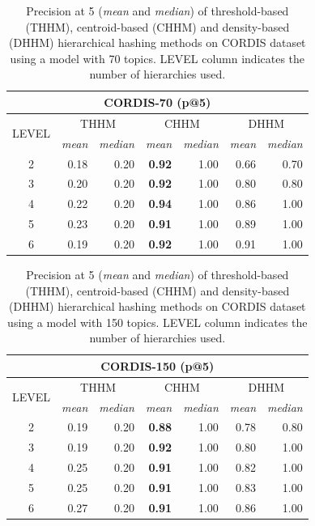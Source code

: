 \begin{table}\centering
  \scriptsize
  \begin{tabular}{c|rr||rr||rr}
    \multicolumn{7}{c}{CORDIS-70 (p@5)} \\
    \toprule
    \multirow{2}{*}{LEVEL} &
      \multicolumn{2}{c}{THHM} &
      \multicolumn{2}{c}{CHHM} &
      \multicolumn{2}{c}{DHHM} \\
      & {\textit{mean}} & {\textit{median}} & {\textit{mean}} & {\textit{median}} & {\textit{mean}} & {\textit{median}} \\
      \midrule
    2 & 0.18 & 0.20 & \textbf{0.92} & 1.00 & 0.66 & 0.70 \\
    3 & 0.20 & 0.20 & \textbf{0.92} & 1.00 & 0.80 & 0.80 \\
    4 & 0.22 & 0.20 & \textbf{0.94} & 1.00 & 0.86 & 1.00 \\
    5 & 0.23 & 0.20 & \textbf{0.91} & 1.00 & 0.89 & 1.00 \\
    6 & 0.19 & 0.20 & \textbf{0.92} & 1.00 & 0.91 & 1.00 \\
    \bottomrule
  \end{tabular}
\caption{Precision at 5 (\textit{mean} and \textit{median}) of threshold-based (THHM), centroid-based (CHHM) and density-based (DHHM) hierarchical hashing methods on CORDIS dataset using a model with 70 topics. LEVEL column indicates the number of hierarchies used.}
\label{tb:cordis70-p}
\end{table}


\begin{table}\centering
  \scriptsize
  \begin{tabular}{c|rr||rr||rr}
    \multicolumn{7}{c}{CORDIS-150 (p@5)} \\
    \toprule
    \multirow{2}{*}{LEVEL} &
      \multicolumn{2}{c}{THHM} &
      \multicolumn{2}{c}{CHHM} &
      \multicolumn{2}{c}{DHHM} \\
      & {\textit{mean}} & {\textit{median}} & {\textit{mean}} & {\textit{median}} & {\textit{mean}} & {\textit{median}} \\
      \midrule
     2 & 0.19 & 0.20 & \textbf{0.88} & 1.00 & 0.78 & 0.80 \\
     3 & 0.19 & 0.20 & \textbf{0.92} & 1.00 & 0.80 & 1.00 \\
     4 & 0.25 & 0.20 & \textbf{0.91} & 1.00 & 0.82 & 1.00 \\
     5 & 0.25 & 0.20 & \textbf{0.91} & 1.00 & 0.83 & 1.00 \\
     6 & 0.27 & 0.20 & \textbf{0.91} & 1.00 & 0.86 & 1.00 \\
    \bottomrule
  \end{tabular}
\caption{Precision at 5 (\textit{mean} and \textit{median}) of threshold-based (THHM), centroid-based (CHHM) and density-based (DHHM) hierarchical hashing methods on CORDIS dataset using a model with 150 topics. LEVEL column indicates the number of hierarchies used.}
\label{tb:cordis150-p}
\end{table}

